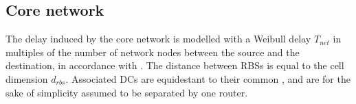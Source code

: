 \subsection{Core network}
The delay induced by the core network is modelled with a Weibull delay $T_{net}$ in multiples of the number of network nodes between the source and the destination, in accordance with \cite{papagiannaki2003measurement}. The distance between \ac{RBS}s is equal to the cell dimension $d_{rbs}$. Associated \ac{DC}s are equidestant to their common , and are for the sake of simplicity assumed to be separated by one router.